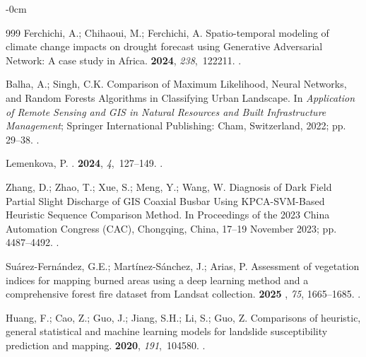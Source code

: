 \documentclass[jimaging,article,accept,pdftex,moreauthors]{Definitions/mdpi}
\begin{document}
\begin{adjustwidth}{-\extralength}{0cm}
\begin{thebibliography}{999}
Ferchichi, A.; Chihaoui, M.; Ferchichi, A.
\newblock Spatio-temporal modeling of climate change impacts on drought
  forecast using Generative Adversarial Network: A case study in Africa.
 {\bf 2024}, {\em 238},~122211.
.

Balha, A.; Singh, C.K. Comparison of Maximum Likelihood, Neural Networks, and
  Random Forests Algorithms in Classifying Urban Landscape.
\newblock In {\em Application of Remote Sensing and GIS in Natural Resources
  and Built Infrastructure Management}; Springer International Publishing:
  Cham, Switzerland, 2022; pp. 29--38.
.

Lemenkova, P.
.
 {\bf 2024}, {\em 4},~127--149.
.

Zhang, D.; Zhao, T.; Xue, S.; Meng, Y.; Wang, W.
\newblock Diagnosis of Dark Field Partial Slight Discharge of GIS Coaxial
  Busbar Using KPCA-SVM-Based Heuristic Sequence Comparison Method.
\newblock In Proceedings of the 2023 China Automation Congress (CAC),  Chongqing, China, 17--19 November 2023;
  pp. 4487--4492.
.

Suárez-Fernández, G.E.; Martínez-Sánchez, J.; Arias, P.
\newblock Assessment of vegetation indices for mapping burned areas using a
  deep learning method and a comprehensive forest fire dataset from Landsat
  collection.
 {\bf 2025%
}, \emph{75}, 1665--1685.
.

Huang, F.; Cao, Z.; Guo, J.; Jiang, S.H.; Li, S.; Guo, Z.
\newblock Comparisons of heuristic, general statistical and machine learning
  models for landslide susceptibility prediction and mapping.
 {\bf 2020}, {\em 191},~104580.
.


\end{thebibliography}
\end{adjustwidth}
\end{document}
